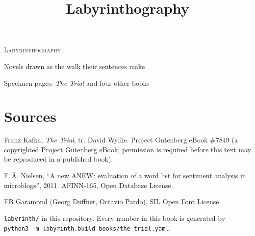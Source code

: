 \documentclass[10pt,twoside,openright]{memoir}
\title{Labyrinthography}
\begin{document}
\frontmatter
\pagestyle{empty}
\begin{center}
\vspace*{40mm}
{\Huge\scshape Labyrinthography}\par
\bigskip
{\large Novels drawn as the walk their sentences make}\par
\vfill
{\small Specimen pages: \emph{The Trial} and four other books}\par
\end{center}
\cleardoublepage
\pagestyle{headings}
\mainmatter





\appendix

\backmatter
\chapter*{Sources}
\begin{description}\small
\item[Text] Franz Kafka, \emph{The Trial}, tr. David Wyllie. Project Gutenberg
eBook \#7849 (a copyrighted Project Gutenberg eBook; permission is required
before this text may be reproduced in a published book).
\item[Lexicon] F.\,Å. Nielsen, ``A new ANEW: evaluation of a word list for
sentiment analysis in microblogs'', 2011. AFINN-165, Open Database License.
\item[Type] EB Garamond (Georg Duffner, Octavio Pardo), SIL Open Font License.
\item[Code] \texttt{labyrinth/} in this repository. Every number in this book
is generated by \texttt{python3 -m labyrinth.build books/the-trial.yaml}.
\end{description}
\end{document}
